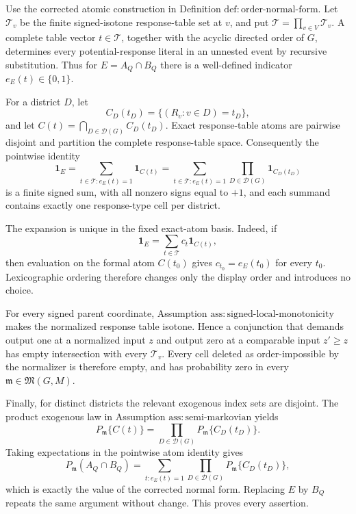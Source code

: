 Use the corrected atomic construction in Definition \(\mathrm{def:order\text{-}normal\text{-}form}\).  Let \(\mathcal T_v\) be the finite signed-isotone response-table set at \(v\), and put \(\mathcal T=\prod_{v\in V}\mathcal T_v\).  A complete table vector \(t\in\mathcal T\), together with the acyclic directed order of \(G\), determines every potential-response literal in an unnested event by recursive substitution.  Thus for \(E=A_Q\cap B_Q\) there is a well-defined indicator \(e_E(t)\in\{0,1\}\).

For a district \(D\), let
\[
 C_D(t_D)=\{(R_v:v\in D)=t_D\},
\]
and let \(C(t)=\bigcap_{D\in\mathcal D(G)}C_D(t_D)\).  Exact response-table atoms are pairwise disjoint and partition the complete response-table space.  Consequently the pointwise identity
\[
 \mathbf 1_E
 =\sum_{t\in\mathcal T:e_E(t)=1}\mathbf 1_{C(t)}
 =\sum_{t\in\mathcal T:e_E(t)=1}
   \prod_{D\in\mathcal D(G)}\mathbf 1_{C_D(t_D)}
\]
is a finite signed sum, with all nonzero signs equal to \(+1\), and each summand contains exactly one response-type cell per district.

The expansion is unique in the fixed exact-atom basis.  Indeed, if
\[
 \mathbf 1_E=\sum_{t\in\mathcal T}c_t\mathbf 1_{C(t)},
\]
then evaluation on the formal atom \(C(t_0)\) gives \(c_{t_0}=e_E(t_0)\) for every \(t_0\).  Lexicographic ordering therefore changes only the display order and introduces no choice.

For every signed parent coordinate, Assumption \(\mathrm{ass:signed\text{-}local\text{-}monotonicity}\) makes the normalized response table isotone.  Hence a conjunction that demands output one at a normalized input \(z\) and output zero at a comparable input \(z'\geq z\) has empty intersection with every \(\mathcal T_v\).  Every cell deleted as order-impossible by the normalizer is therefore empty, and has probability zero in every \(\mathfrak m\in\mathfrak M(G,M)\).

Finally, for distinct districts the relevant exogenous index sets are disjoint.  The product exogenous law in Assumption \(\mathrm{ass:semi\text{-}markovian}\) yields
\[
 P_{\mathfrak m}\{C(t)\}
 =\prod_{D\in\mathcal D(G)}P_{\mathfrak m}\{C_D(t_D)\}.
\]
Taking expectations in the pointwise atom identity gives
\[
 P_{\mathfrak m}(A_Q\cap B_Q)
 =\sum_{t:e_E(t)=1}
   \prod_{D\in\mathcal D(G)}P_{\mathfrak m}\{C_D(t_D)\},
\]
which is exactly the value of the corrected normal form.  Replacing \(E\) by \(B_Q\) repeats the same argument without change.  This proves every assertion.
